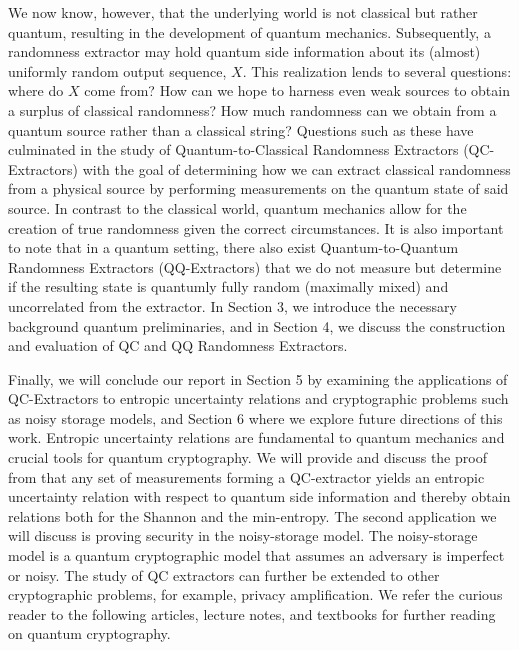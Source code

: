 We now know, however, that the underlying world is not classical but rather quantum, resulting in the development of quantum mechanics. %
Subsequently, a randomness extractor may hold quantum side information about its (almost) uniformly random output sequence, $X$. This realization lends to several questions: where do $X$ come from? How can we hope to harness even weak sources to obtain a surplus of classical randomness? How much randomness can we obtain from a quantum source rather than a classical string? \cite{Berta_2014} Questions such as these have culminated in the study of Quantum-to-Classical Randomness Extractors (QC-Extractors) with the goal of determining how we can extract classical randomness from a physical source by performing measurements on the quantum state of said source. In contrast to the classical world, quantum mechanics allow for the creation of true randomness given the correct circumstances. It is also important to note that in a quantum setting, there also exist Quantum-to-Quantum Randomness Extractors (QQ-Extractors) that we do not measure but determine if the resulting state is quantumly fully random (maximally mixed) and uncorrelated from the extractor. In Section 3, we introduce the necessary background quantum preliminaries, and in Section 4, we discuss the construction and evaluation of QC and QQ Randomness Extractors.

Finally, we will conclude our report in Section 5 by examining the applications of QC-Extractors to entropic uncertainty relations and cryptographic problems such as noisy storage models, and Section 6 where we explore future directions of this work. Entropic uncertainty relations are fundamental to quantum mechanics and crucial tools for quantum cryptography. We will provide and discuss the proof from \cite{Berta_2014} that any set of measurements forming a QC-extractor yields an entropic uncertainty relation with respect to quantum side information and thereby obtain relations both for the Shannon and the min-entropy. The second application we will discuss is proving security in the noisy-storage model. The noisy-storage model is a quantum cryptographic model that assumes an adversary is imperfect or noisy. The study of QC extractors can further be extended to other cryptographic problems, for example, privacy amplification. We refer the curious reader to the following articles, lecture notes, and textbooks \cite{Berta_2014,tudelftQC,lo2007quantum,bruss2007quantum, bernstein2009introduction,bennett1992quantum,berta2013quantum,wilde2013quantum,nielsen2002quantum} for further reading on quantum cryptography.    